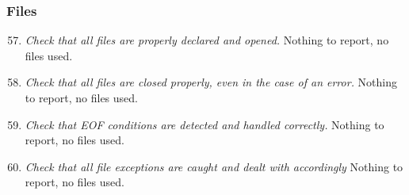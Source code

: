 	\subsubsection{Files}
		\begin{enumerate}
			\setcounter{enumi}{56}
			\item \textit{Check that all files are properly declared and opened.}\newline
			Nothing to report, no files used. %

			\item \textit{Check that all files are closed properly, even in the case of an error.}\newline
			Nothing to report, no files used. %

			\item \textit{Check that EOF conditions are detected and handled correctly.}\newline
			Nothing to report, no files used. %

			\item \textit{Check that all file exceptions are caught and dealt with accordingly}\newline
			Nothing to report, no files used. %

		\end{enumerate}